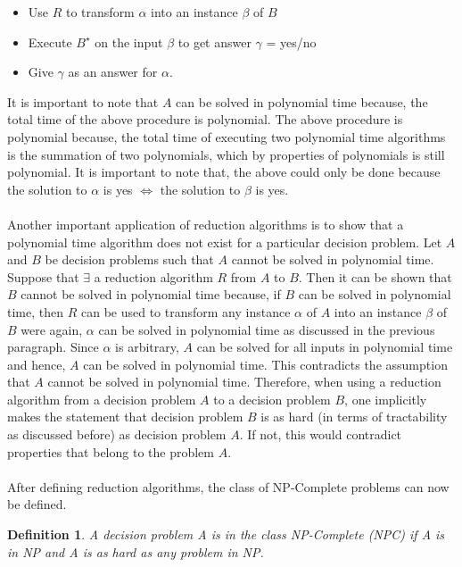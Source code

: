 \documentclass{article}
\newtheorem{definition}{Definition}[subsection]
\begin{document}
 \begin{itemize}
	\item Use $\mathit{R}$ to transform $\mathit{\alpha}$ into an instance $\mathit{\beta}$ of $\mathit{B}$
	\item Execute $\mathit{B^\star}$ on the input $\beta$ to get answer $\gamma$ = yes/no
	\item Give $\mathit{\gamma}$ as an answer for $\mathit{\alpha}$.
\end{itemize} 
It is important to note that $\mathit{A}$ can be solved in polynomial time because, the total time of the above procedure is polynomial. The above procedure is polynomial because, the total time of executing two polynomial time algorithms is the summation of two polynomials, which by properties of polynomials is still polynomial. It is important to note that, the above could only be done because the solution to $\alpha$ is yes $\iff$ the solution to $\beta$ is yes. \cite{cormen_leiserson_rivest_stein}\\\\
Another important application of reduction algorithms is to show that a polynomial time algorithm does not exist for a particular decision problem. Let $\mathit{A}$ and $\mathit{B}$ be decision problems such that $\mathit{A}$ cannot be solved in polynomial time. Suppose that $\exists$ a reduction algorithm $\mathit{R}$ from $\mathit{A}$ to $\mathit{B}$. Then it can be shown that $\mathit{B}$ cannot be solved in polynomial time because, if $\mathit{B}$ can be solved in polynomial time, then $\mathit{R}$ can be used to transform any instance $\alpha$ of $\mathit{A}$ into an instance $\beta$ of $\mathit{B}$ were again, $\alpha$ can be solved in polynomial time as discussed in the previous paragraph. Since $\alpha$ is arbitrary, $\mathit{A}$ can be solved for all inputs in polynomial time and hence, $\mathit{A}$ can be solved in polynomial time. This contradicts the assumption that $\mathit{A}$ cannot be solved in polynomial time. Therefore, when using a reduction algorithm from a decision problem $\mathit{A}$ to a decision problem $\mathit{B}$, one implicitly makes the statement that decision problem $\mathit{B}$ is as hard (in terms of tractability as discussed before) as decision problem $\mathit{A}$. If not, this would contradict properties that belong to the problem $\mathit{A}$. \cite{cormen_leiserson_rivest_stein}\\\\
After defining reduction algorithms, the class of NP-Complete problems can now be defined.
\begin{definition}
\label{NPC}
A decision problem A is in the class NP-Complete (NPC) if A is in NP and A is as hard as any problem in NP. { }
\end{definition}
\end{document}
